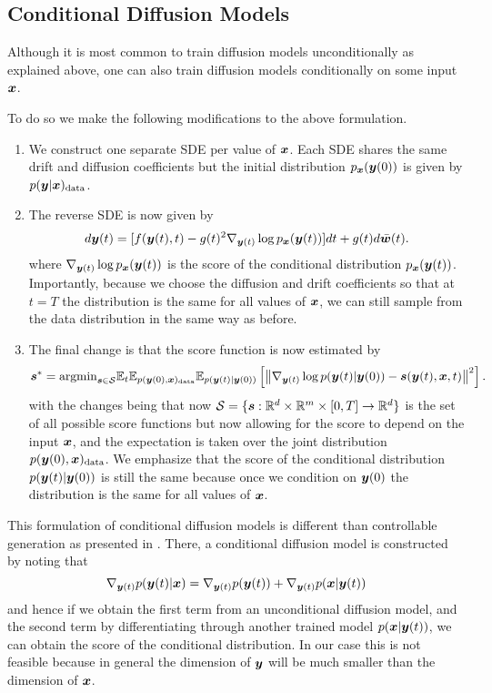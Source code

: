 \subsection*{Conditional Diffusion Models}
Although it is most common to train diffusion models unconditionally as explained above, one can also train
diffusion models conditionally on some input $\boldsymbol{x}$.

To do so we make the following modifications to the above formulation.
\begin{enumerate}
    \item We construct one separate SDE per value of $\boldsymbol{x}$. Each SDE shares the same drift and diffusion coefficients
    but the initial distribution $p_{\boldsymbol{x}}(\boldsymbol{y}(0))$ is given by $p(\boldsymbol{y}| \boldsymbol{x})_{\text{data}}$.
    \item The reverse SDE is now given by
    \begin{align}
        d \boldsymbol{y}(t) = [f(\boldsymbol{y}(t), t) - g(t)^2 \nabla_{\boldsymbol{y}(t)} \log p_{\boldsymbol{x}}(\boldsymbol{y}(t))] dt + g(t) d\bar{\boldsymbol{w}}(t).
    \end{align}
    where $\nabla_{\boldsymbol{y}(t)} \log p_{\boldsymbol{x}}(\boldsymbol{y}(t))$ is the score of the conditional distribution $p_{\boldsymbol{x}}(\boldsymbol{y}(t))$.
    Importantly, because we choose the diffusion and drift coefficients so that at $t = T$ the distribution is the same
    for all values of $\boldsymbol{x}$, we can still sample from the data distribution in the same way as before.
    \item The final change is that the score function is now estimated by
    \begin{align*}
    \boldsymbol{s}^* = \text{argmin}_{\boldsymbol{s} \in \mathcal{S}}  \mathbb{E}_{t}\mathbb{E}_{p(\boldsymbol{y}(0), \boldsymbol{x})_\text{data}}\mathbb{E}_{p(\boldsymbol{y}(t)|\boldsymbol{y}(0))} \left[ \left\| \nabla_{\boldsymbol{y}(t)} \log p(\boldsymbol{y}(t)| \boldsymbol{y}(0)) - \boldsymbol{s}(\boldsymbol{y}(t),\boldsymbol{x}, t) \right\|^2 \right].
    \end{align*}
    with the changes being that now $\mathcal{S} = \{ \boldsymbol{s}: \mathbb{R}^d \times \mathbb{R}^m \times [0, T] \to \mathbb{R}^d \}$ is the set of all possible
    score functions but now allowing for the score to depend on the input $\boldsymbol{x}$, and the expectation is taken over the joint distribution
    $p(\boldsymbol{y}(0), \boldsymbol{x})_\text{data}$.
    We emphasize that the score of the conditional distribution $p(\boldsymbol{y}(t)| \boldsymbol{y}(0))$ is still
    the same because once we condition on $\boldsymbol{y}(0)$ the distribution is the same for all values of $\boldsymbol{x}$.

\end{enumerate}
This formulation of conditional diffusion models is different than controllable generation as
presented in \cite{song2021scorebased}. There, a conditional diffusion model is constructed by noting
that
\[ \nabla_{\boldsymbol{y}(t)} p(\boldsymbol{y}(t)| \boldsymbol{x}) = \nabla_{\boldsymbol{y}(t)} p(\boldsymbol{y}(t)) + \nabla_{\boldsymbol{y}(t)} p(\boldsymbol{x}| \boldsymbol{y}(t)) \]
and hence if we obtain the first term from an unconditional diffusion model, and the second term by differentiating
through another trained model $p(\boldsymbol{x}| \boldsymbol{y}(t))$, we can obtain the score of the conditional distribution.
In our case this is not feasible because in general the dimension of $\boldsymbol{y}$ will be much smaller than the dimension of $\boldsymbol{x}$.



